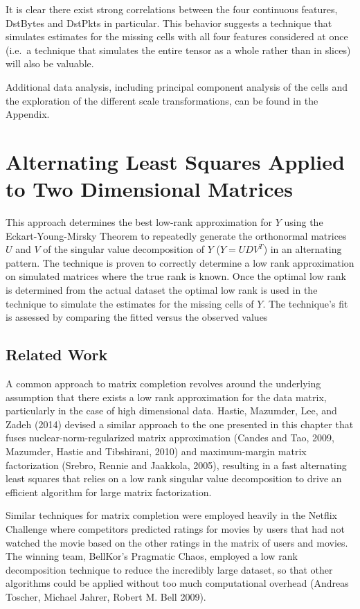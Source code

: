 \documentclass[12pt,twoside]{dukestatscithesis}
\theoremstyle{definition}
\theoremstyle{definition}
\theoremstyle{definition}
\theoremstyle{remark}
\begin{document}
It is clear there exist strong correlations between the four continuous
features, DstBytes and DstPkts in particular. This behavior suggests a
technique that simulates estimates for the missing cells with all four
features considered at once (i.e.~a technique that simulates the entire
tensor as a whole rather than in slices) will also be valuable.

Additional data analysis, including principal component analysis of the
cells and the exploration of the different scale transformations, can be
found in the Appendix.

\chapter{Alternating Least Squares Applied to Two Dimensional
Matrices}\label{alternating-least-squares-applied-to-two-dimensional-matrices}

This approach determines the best low-rank approximation for \(Y\) using
the Eckart-Young-Mirsky Theorem to repeatedly generate the orthonormal
matrices \(U\) and \(V\) of the singular value decomposition of \(Y\)
(\(Y = UDV^T\)) in an alternating pattern. The technique is proven to
correctly determine a low rank approximation on simulated matrices where
the true rank is known. Once the optimal low rank is determined from the
actual dataset the optimal low rank is used in the technique to simulate
the estimates for the missing cells of \(Y\). The technique's fit is
assessed by comparing the fitted versus the observed values

\section{Related Work}\label{related-work}

A common approach to matrix completion revolves around the underlying
assumption that there exists a low rank approximation for the data
matrix, particularly in the case of high dimensional data. Hastie,
Mazumder, Lee, and Zadeh (2014) devised a similar approach to the one
presented in this chapter that fuses nuclear-norm-regularized matrix
approximation (Candes and Tao, 2009, Mazumder, Hastie and Tibshirani,
2010) and maximum-margin matrix factorization (Srebro, Rennie and
Jaakkola, 2005), resulting in a fast alternating least squares that
relies on a low rank singular value decomposition to drive an efficient
algorithm for large matrix factorization.

Similar techniques for matrix completion were employed heavily in the
Netflix Challenge where competitors predicted ratings for movies by
users that had not watched the movie based on the other ratings in the
matrix of users and movies. The winning team, BellKor's Pragmatic Chaos,
employed a low rank decomposition technique to reduce the incredibly
large dataset, so that other algorithms could be applied without too
much computational overhead (Andreas Toscher, Michael Jahrer, Robert M.
Bell 2009).
\end{document}
